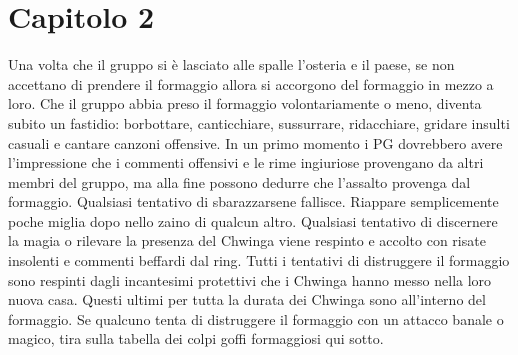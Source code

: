 \documentclass{article}
\begin{document}
\section{Capitolo 2}
Una volta che il gruppo si è lasciato alle spalle l'osteria e il paese, se non accettano di prendere il formaggio allora si accorgono del formaggio in mezzo a loro. Che il gruppo abbia preso il formaggio volontariamente o meno, diventa subito un fastidio: borbottare, canticchiare, sussurrare, ridacchiare, gridare insulti casuali e cantare canzoni offensive.
In un primo momento i PG dovrebbero avere l'impressione che i commenti offensivi e le rime ingiuriose provengano da altri membri del gruppo, ma alla fine possono dedurre che l'assalto provenga dal formaggio.
Qualsiasi tentativo di sbarazzarsene fallisce. Riappare semplicemente poche miglia dopo nello zaino di qualcun altro.
Qualsiasi tentativo di discernere la magia o rilevare la presenza del Chwinga viene respinto e accolto con risate insolenti e commenti beffardi dal ring.
Tutti i tentativi di distruggere il formaggio sono respinti dagli incantesimi protettivi che i Chwinga hanno messo nella loro nuova casa. Questi ultimi per tutta la durata dei Chwinga sono all'interno del formaggio. Se qualcuno tenta di distruggere il formaggio con un attacco banale o magico, tira sulla tabella dei colpi goffi formaggiosi qui sotto.
\end{document}
